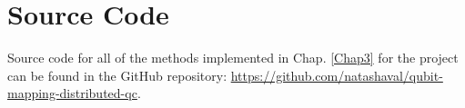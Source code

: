 \chapter{Source Code} \label{source-code}
Source code for all of the methods implemented in Chap. \ref{Chap3} for the project can be found in the GitHub repository: \newline \url{https://github.com/natashaval/qubit-mapping-distributed-qc}. \newline \\





